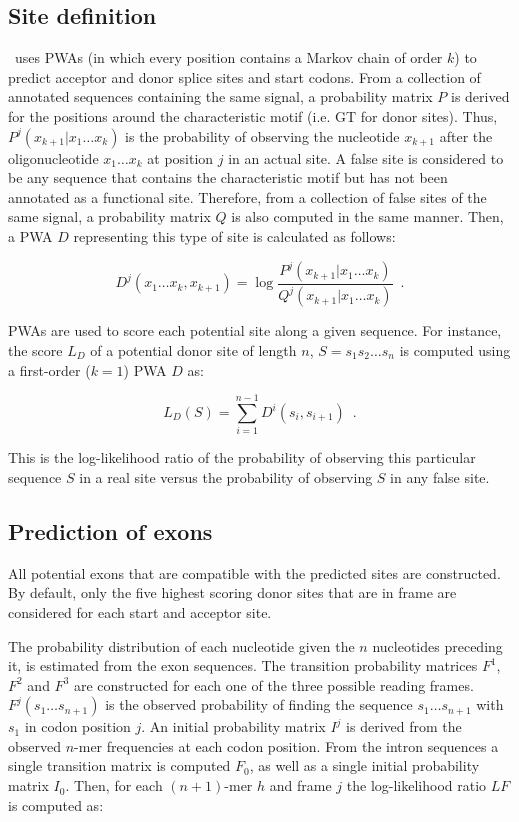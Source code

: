 \subsection{Site definition}
\label{geneid PWAs}
\geneid\ uses PWAs (in which every position contains a Markov chain 
of order $k$) to predict acceptor and donor splice sites and start
codons. From a collection of annotated sequences containing the same
signal, a probability matrix $P$ is derived for the positions around
the characteristic motif (i.e. GT for donor sites). Thus,
$P^j{(x_{k+1} | x_1 \ldots x_k)}$ is the probability of observing the
nucleotide $x_{k+1}$ after the oligonucleotide $x_1 \ldots x_k$ at
position $j$ in an actual site. A false site is considered to be any
sequence that contains the characteristic motif but has not been
annotated as a functional site. Therefore, from a collection of false
sites of the same signal, a probability matrix $Q$ is also computed in
the same manner. Then, a PWA $D$ representing this type of site is
calculated as follows:

\begin{equation}
D^j{(x_1 \ldots x_k, x_{k+1})} = \log{\frac{P^j{(x_{k+1} | x_1 \ldots
x_k)}}{Q^j{(x_{k+1} | x_1 \ldots x_k)}}} \,\,\,.
\end{equation}

PWAs are used to score each potential site along a given sequence. For
instance, the score $L_D$ of a potential donor site of length $n$,
$S=s_1 s_2 \ldots s_n$ is computed using a first-order ($k = 1$) PWA
$D$ as:

\begin{equation}
L_D(S) = \sum_{i=1}^{n - 1}{D^i{(s_i, s_{i+1})}} \,\,\,.
\end{equation}

This is the log-likelihood ratio of the probability of observing this
particular sequence $S$ in a real site versus the probability of
observing $S$ in any false site.

\subsection{Prediction of exons}

All potential exons that are compatible with the predicted sites are
constructed.  By default, only the five highest scoring donor sites
that are in frame are considered for each start and acceptor site.

The probability distribution of each nucleotide given the $n$
nucleotides preceding it, is estimated from the exon sequences. The
transition probability matrices $F^1$, $F^2$ and $F^3$ are constructed
for each one of the three possible reading frames. $F^j (s_1 \ldots
s_{n+1})$ is the observed probability of finding the sequence $s_1
\ldots s_{n+1}$ with $s_1$ in codon position $j$. An initial
probability matrix $I^j$ is derived from the observed $n$-mer
frequencies at each codon position.  From the intron sequences a
single transition matrix is computed $F_0$, as well as a single
initial probability matrix $I_0$. Then, for each $(n+1)$-mer $h$ and
frame $j$ the log-likelihood ratio $LF$ is computed as:

